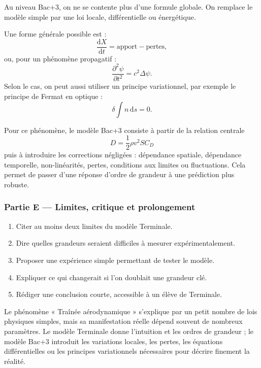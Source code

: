 \documentclass[11pt,a4paper]{article}
\begin{document}
\begin{approfondissementbox}
Au niveau Bac+3, on ne se contente plus d'une formule globale. On remplace le modèle simple par une loi locale, différentielle ou énergétique.

Une forme générale possible est :
\[
\frac{\mathrm d X}{\mathrm dt}=\text{apport}-\text{pertes},
\]
ou, pour un phénomène propagatif :
\[
\frac{\partial^2 \psi}{\partial t^2}=c^2\Delta\psi.
\]
Selon le cas, on peut aussi utiliser un principe variationnel, par exemple le principe de Fermat en optique :
\[
\delta \int n\,\mathrm ds=0.
\]

Pour ce phénomène, le modèle Bac+3 consiste à partir de la relation centrale
\[
D=\frac12\rho v^2SC_D
\]
puis à introduire les corrections négligées : dépendance spatiale, dépendance temporelle, non-linéarités, pertes, conditions aux limites ou fluctuations. Cela permet de passer d'une réponse d'ordre de grandeur à une prédiction plus robuste.
\end{approfondissementbox}

\subsubsection*{Partie E — Limites, critique et prolongement}

\begin{enumerate}
  \item Citer au moins deux limites du modèle Terminale.
  \item Dire quelles grandeurs seraient difficiles à mesurer expérimentalement.
  \item Proposer une expérience simple permettant de tester le modèle.
  \item Expliquer ce qui changerait si l'on doublait une grandeur clé.
  \item Rédiger une conclusion courte, accessible à un élève de Terminale.
\end{enumerate}

\begin{corrigebox}
Le phénomène « Traînée aérodynamique » s'explique par un petit nombre de lois physiques simples, mais sa manifestation réelle dépend souvent de nombreux paramètres. Le modèle Terminale donne l'intuition et les ordres de grandeur ; le modèle Bac+3 introduit les variations locales, les pertes, les équations différentielles ou les principes variationnels nécessaires pour décrire finement la réalité.
\end{corrigebox}
\end{document}
